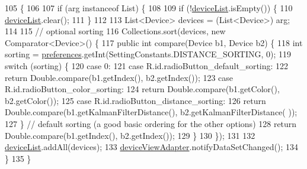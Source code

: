 \begin{DoxyCode}
105                                                  \{
106 
107         \textcolor{keywordflow}{if} (arg instanceof List) \{
108 
109             \textcolor{keywordflow}{if} (!\hyperlink{classit_1_1unibo_1_1torsello_1_1bluetoothpositioning_1_1fragment_1_1devicesObservers_1_1DeviceListFragment_ad728f2e256af2d4acf05d3cf900f3ad4_ad728f2e256af2d4acf05d3cf900f3ad4}{deviceList}.isEmpty()) \{
110                 \hyperlink{classit_1_1unibo_1_1torsello_1_1bluetoothpositioning_1_1fragment_1_1devicesObservers_1_1DeviceListFragment_ad728f2e256af2d4acf05d3cf900f3ad4_ad728f2e256af2d4acf05d3cf900f3ad4}{deviceList}.clear();
111             \}
112 
113             List<Device> devices = (List<Device>) arg;
114 
115             \textcolor{comment}{// optional sorting}
116             Collections.sort(devices, \textcolor{keyword}{new} Comparator<Device>() \{
117                 \textcolor{keyword}{public} \textcolor{keywordtype}{int} compare(Device b1, Device b2) \{
118                     \textcolor{keywordtype}{int} sorting = \hyperlink{classit_1_1unibo_1_1torsello_1_1bluetoothpositioning_1_1fragment_1_1devicesObservers_1_1DeviceListFragment_ac2b5a8b56dc71b8a217dbc37515e2052_ac2b5a8b56dc71b8a217dbc37515e2052}{preferences}.getInt(SettingConstants.DISTANCE\_SORTING, 0);
119                     \textcolor{keywordflow}{switch} (sorting) \{
120                         \textcolor{keywordflow}{case} 0:
121                         \textcolor{keywordflow}{case} R.id.radioButton\_default\_sorting:
122                             \textcolor{keywordflow}{return} Double.compare(b1.getIndex(), b2.getIndex());
123                         \textcolor{keywordflow}{case} R.id.radioButton\_color\_sorting:
124                             \textcolor{keywordflow}{return} Double.compare(b1.getColor(), b2.getColor());
125                         \textcolor{keywordflow}{case} R.id.radioButton\_distance\_sorting:
126                             \textcolor{keywordflow}{return} Double.compare(b1.getKalmanFilterDistance(), b2.getKalmanFilterDistance(
      ));
127                     \} \textcolor{comment}{// default sorting (a good basic ordering for the other options)}
128                     \textcolor{keywordflow}{return} Double.compare(b1.getIndex(), b2.getIndex());
129                 \}
130             \});
131 
132             \hyperlink{classit_1_1unibo_1_1torsello_1_1bluetoothpositioning_1_1fragment_1_1devicesObservers_1_1DeviceListFragment_ad728f2e256af2d4acf05d3cf900f3ad4_ad728f2e256af2d4acf05d3cf900f3ad4}{deviceList}.addAll(devices);
133             \hyperlink{classit_1_1unibo_1_1torsello_1_1bluetoothpositioning_1_1fragment_1_1devicesObservers_1_1DeviceListFragment_a5a6d0882c9d5551b13936776fb712b0a_a5a6d0882c9d5551b13936776fb712b0a}{deviceViewAdapter}.notifyDataSetChanged();
134         \}
135     \}
\end{DoxyCode}


